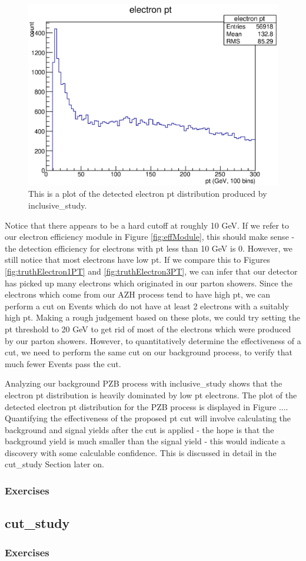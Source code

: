 \documentclass{article}
\begin{document}
\begin{figure}[!htbp]
	\centering
	\includegraphics[width = \linewidth]{electron_pt.eps}
	\caption{This is a plot of the detected electron pt distribution produced by inclusive\_study.} 
	\label{fig:electronPT}
\end{figure}

\bigskip

Notice that there appears to be a hard cutoff at roughly 10 GeV. If we refer to our electron efficiency module in Figure \ref{fig:effModule}, this should make sense -
the detection efficiency for electrons with pt less than 10 GeV is 0. However, we still notice that most electrons have low pt. If we compare this to Figures \ref{fig:truthElectron1PT}
and \ref{fig:truthElectron3PT}, we can infer that our detector has picked up many electrons which originated in our parton showers. Since the electrons which come
from our AZH process tend to have high pt, we can perform a cut on Events which do not have at least 2 electrons with a suitably high pt. Making a rough judgement
based on these plots, we could try setting the pt threshold to 20 GeV to get rid of most of the electrons which were produced by our parton showers. However,
to quantitatively determine the effectiveness of a cut, we need to perform the same cut on our background process, to verify that much fewer Events pass the cut.

\bigskip

Analyzing our background PZB process with inclusive\_study shows that the electron pt distribution is heavily dominated by low pt electrons. The plot
of the detected electron pt distribution for the PZB process is displayed in Figure .... Quantifying the effectiveness of the proposed pt cut will
involve calculating the background and signal yields after the cut is applied - the hope is that the background yield is much smaller than the signal
yield - this would indicate a discovery with some calculable confidence. This is discussed in detail in the cut\_study Section later on.

\subsubsection*{Exercises}

\subsection{cut\_study}

\subsubsection*{Exercises}
\end{document}
